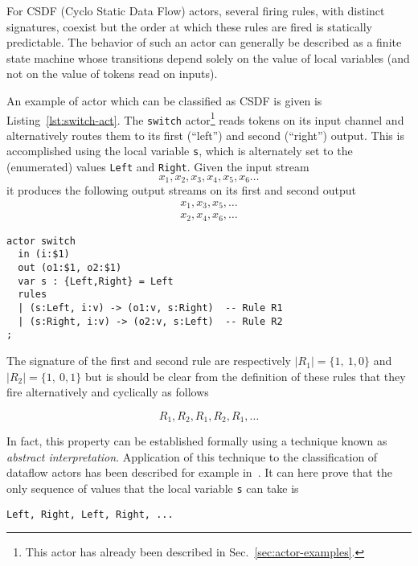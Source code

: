 For CSDF (Cyclo Static Data Flow) actors, several firing rules, with distinct signatures, coexist
but the order at which these rules are fired is statically predictable. The behavior of
such an actor can generally be described as a finite state machine whose transitions depend solely on the
value of local variables (and not on the value of tokens read on inputs).

\medskip
An example of actor which can be classified as CSDF is given is Listing~\ref{lst:switch-act}.
The \verb|switch| actor\footnote{This actor has already been described in
  Sec.~\ref{sec:actor-examples}.} reads tokens on
its input channel and alternatively routes them to its first (``left'') and second (``right'')
output. This is accomplished using the local variable \texttt{s}, which is alternately set
  to the (enumerated) values \texttt{Left} and \texttt{Right}.
Given the input stream
\begin{equation*}
x_1, x_2, x_3, x_4, x_5, x_6 \ldots  
\end{equation*}
it produces the following output streams on its first and second output
\begin{eqnarray*}
x_1, x_3, x_5, \ldots  \\
x_2, x_4, x_6, \ldots  
\end{eqnarray*}

\begin{lstlisting}[caption={A simple CSDF actor in CAPH},label=lst:switch-act]
actor switch
  in (i:$1)
  out (o1:$1, o2:$1)
  var s : {Left,Right} = Left
  rules
  | (s:Left, i:v) -> (o1:v, s:Right)  -- Rule R1
  | (s:Right, i:v) -> (o2:v, s:Left)  -- Rule R2
;
\end{lstlisting}

The signature of the first and second rule are respectively $|R_1|=\{1,\ 1,0\}$ and
$|R_2|=\{1,\ 0,1\}$ but is should be clear from the definition of these rules that they fire
alternatively and cyclically as follows

\begin{equation*}
  R_1, R_2, R_1, R_2, R_1, \ldots
\end{equation*}

In fact, this property can be established formally
using a technique known as \emph{abstract interpretation}. Application of this technique to the
classification of dataflow actors has been described for example in~\cite{Wipliez2012}. It can here
prove that the only sequence of values that the local variable \verb|s| can take is

\begin{center}
\begin{verbatim}
Left, Right, Left, Right, ...
\end{verbatim}
\end{center}

